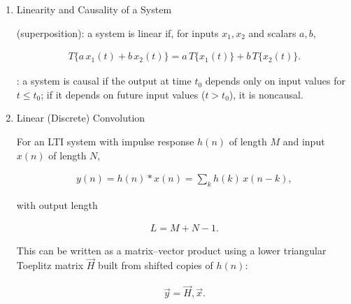 \begin{enumerate}[label=\thesubsection.\arabic*,ref=\thesubsection.\theenumi]
\begin{align}
-e^x = (-1) \cdot e^x
\end{align}

Applying Euler's identity, $-1$ can be expressed in complex exponential form as:

\begin{align}
-1 = e^{i(2k+1)\pi}, \quad \text{for } k \in \mathbb{Z}
\end{align}

By solving:

\begin{align}
-e^x &= e^{x} \cdot e^{i(2k+1)\pi}\\
&= e^{x + i(2k+1)\pi} \label{e^x}
\end{align}




\item Linearity and Causality of a System \label{conditions}

 (superposition): a system is linear if, for inputs
$x_1,x_2$ and scalars $a,b$,

\begin{align}
T\{a\,x_1(t)+b\,x_2(t)\}=a\,T\{x_1(t)\}+b\,T\{x_2(t)\}.
\end{align}

: a system is causal if the output at time $t_0$
depends only on input values for $t\le t_0$; if it depends on future
input values ($t>t_0$), it is noncausal.

\item Linear (Discrete) Convolution

For an LTI system with impulse response $h(n)$ of length $M$ and
input $x(n)$ of length $N$,

\begin{align}
y(n)=h(n)*x(n)=\sum_{k}h(k)\,x(n-k),
\end{align}

with output length

\begin{align}
L=M+N-1. \label{convolution}
\end{align}

This can be written as a matrix--vector product using a lower
triangular Toeplitz matrix $\vec{H}$ built from shifted copies of
$h(n)$:

\begin{align}
\vec{y}=\vec{H},\vec{x}.
\end{align}


\end{enumerate}

